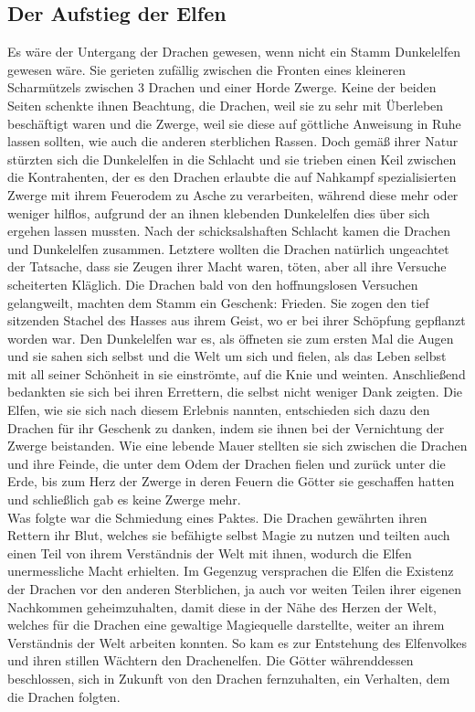 \documentclass[a4paper,12pt,oneside]{book}
\begin{document}
\subsection{Der Aufstieg der Elfen}
Es wäre der Untergang der Drachen gewesen, wenn nicht ein Stamm Dunkelelfen gewesen wäre. Sie gerieten zufällig zwischen die Fronten eines kleineren Scharmützels zwischen 3 Drachen und einer Horde Zwerge. Keine der beiden Seiten schenkte ihnen Beachtung, die Drachen, weil sie zu sehr mit Überleben beschäftigt waren und die Zwerge, weil sie diese auf göttliche Anweisung in Ruhe lassen sollten, wie auch die anderen sterblichen Rassen. Doch gemäß ihrer Natur stürzten sich die Dunkelelfen in die Schlacht und sie trieben einen Keil zwischen die Kontrahenten, der es den Drachen erlaubte die auf Nahkampf spezialisierten Zwerge mit ihrem Feuerodem zu Asche zu verarbeiten, während diese mehr oder weniger hilflos, aufgrund der an ihnen klebenden Dunkelelfen dies über sich ergehen lassen mussten. Nach der schicksalshaften Schlacht kamen die Drachen und Dunkelelfen zusammen. Letztere wollten die Drachen natürlich ungeachtet der Tatsache, dass sie Zeugen ihrer Macht waren, töten, aber all ihre Versuche scheiterten Kläglich. Die Drachen bald von den hoffnungslosen Versuchen gelangweilt, machten dem Stamm ein Geschenk: Frieden. Sie zogen den tief sitzenden Stachel des Hasses aus ihrem Geist, wo er bei ihrer Schöpfung gepflanzt worden war. Den Dunkelelfen war es, als öffneten sie zum ersten Mal die Augen und sie sahen sich selbst und die Welt um sich und fielen, als das Leben selbst mit all seiner Schönheit in sie einströmte, auf die Knie und weinten. Anschließend bedankten sie sich bei ihren Errettern, die selbst nicht weniger Dank zeigten. Die Elfen, wie sie sich nach diesem Erlebnis nannten, entschieden sich dazu den Drachen für ihr Geschenk zu danken, indem sie ihnen bei der Vernichtung der Zwerge beistanden. Wie eine lebende Mauer stellten sie sich zwischen die Drachen und ihre Feinde, die unter dem Odem der Drachen fielen und zurück unter die Erde, bis zum Herz der Zwerge in deren Feuern die Götter sie geschaffen hatten und schließlich gab es keine Zwerge mehr. 
\\Was folgte war die Schmiedung eines Paktes. Die Drachen gewährten ihren Rettern ihr Blut, welches sie befähigte selbst Magie zu nutzen und teilten auch einen Teil von ihrem Verständnis der Welt mit ihnen, wodurch die Elfen unermessliche Macht erhielten. Im Gegenzug versprachen die Elfen die Existenz der Drachen vor den anderen Sterblichen, ja auch vor weiten Teilen ihrer eigenen Nachkommen geheimzuhalten, damit diese in der Nähe des Herzen der Welt, welches für die Drachen eine gewaltige Magiequelle darstellte, weiter an ihrem Verständnis der Welt arbeiten konnten. So kam es zur Entstehung des Elfenvolkes und ihren stillen Wächtern den Drachenelfen. Die Götter währenddessen beschlossen, sich in Zukunft von den Drachen fernzuhalten, ein Verhalten, dem die Drachen folgten.
\end{document}
